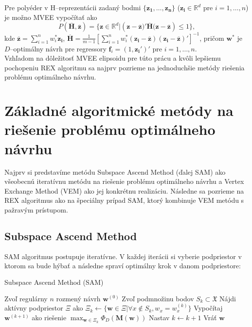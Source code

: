 Pre polyéder v H--reprezentácii zadaný bodmi $\{ \mathbf{z_1, \dots, z_n} \}$ ($\mathbf{z_i} \in \mathbb{R}^d$ pre $i=1,\dots, n$) je možno MVEE vypočítať ako $$P(\mathbf{\overline H, \overline z})= \{ \mathbf{z} \in \mathbb{R}^d | (\mathbf{z-\overline z)'\overline H(z-\overline z}) \le 1 \}, $$ kde $\mathbf{\overline z}=\sum_{i=1}^n w_i^*\mathbf{z_i}$, $\mathbf{\overline H}=\frac{1}{m-1} \left[ \sum_{i=1}^n w_i^*\mathbf{(z_i-\overline z)(z_i-\overline z)'} \right]^{-1} $, pričom $\mathbf{w^*}$ je $D$--optimálny návrh pre regressory $\mathbf{f}_i=(1,\mathbf{z_i}')'$ pre $i=1,\dots, n$.\\

Vzhľadom na dôležitosť MVEE elipsoidu pre túto prácu a kvôli lepšiemu pochopeniu REX algoritmu sa najprv pozrieme na jednoduchšie metódy riešenia problému optimálneho návrhu.

\section{Základné algoritmické metódy na riešenie problému optimálneho návrhu}

Najprv si predstavíme metódu Subspace Ascend Method (ďalej SAM) ako všeobecnú iteratívnu metódu na riešenie problému optimálneho návrhu a Vertex Exchange Method (VEM) ako jej konkrétnu realizáciu. Následne sa pozrieme na REX algoritmus ako na špeciálny prípad SAM, ktorý kombinuje VEM metódu s pažravým prístupom.

\subsection{Subspace Ascend Method}

SAM algoritmus postupuje iteratívne. V každej iterácii si vyberie podpriestor v ktorom sa bude hýbať a následne spraví optimálny krok v danom podpriestore:

\begin{algorithm}[H]
	\caption{Subspace Ascend Method (SAM) \cite{rex_harman}}
	\label{sam}
	\begin{algorithmic}[1]
		\State Zvoľ regulárny $n$ rozmený návrh $\mathbf w^{(0)}$
			\State Zvoľ podmnožinu bodov $S_k \subset \mathfrak X$
			\State Nájdi aktívny podpriestor $\Xi$ ako $\Xi_k \leftarrow \{ \mathbf w \in \Xi | \forall x \not \in S_k, w_x = w_x^{(k)} \}$
			\State Vypočítaj $\mathbf w^{(k+1)}$ ako riešenie $\max_{\mathbf w \in \Xi_k} \Phi_D(\mathbf{M(w)})$
			\State Nastav $k \leftarrow k+1$
		\EndWhile
		\State Vráť $\mathbf w$
	\end{algorithmic}
\end{algorithm}

